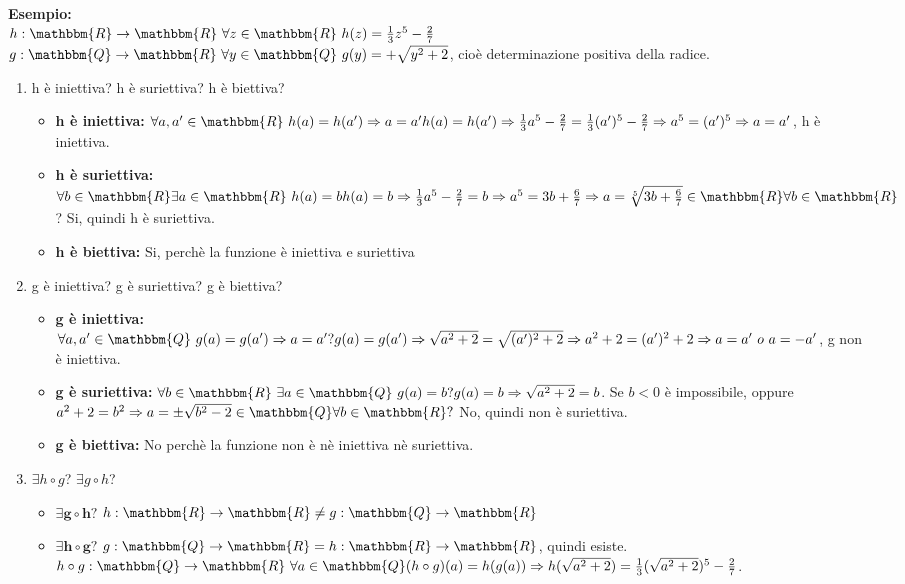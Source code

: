\documentclass[12pt, letterpaper]{report}
\begin{document}
	\textbf{Esempio: }
	\\
	$h: \mathbbm{R} \to \mathbbm{R} \ \forall z \in \mathbbm{R} \ h(z) = \frac{1}{3}z^5 - \frac{2}{7}$
	\\
	$g: \mathbbm{Q} \to \mathbbm{R} \ \forall y \in \mathbbm{Q} \ g(y) = + \sqrt{y^2 + 2}$, cioè determinazione positiva della radice.
	\begin{enumerate}
		\item h è iniettiva? h è suriettiva? h è biettiva?
			\begin{itemize}
				\item \textbf{h è iniettiva:} $\forall a, a' \in \mathbbm{R} \ h(a) = h(a') \Rightarrow a = a' \\ h(a) = h(a') \Rightarrow \frac{1}{3}a^5 - \frac{2}{7} = \frac{1}{3}(a')^5 - \frac{2}{7} \Rightarrow a^5 = (a')^5 \Rightarrow a = a'$, h è iniettiva.
				\item \textbf{h è suriettiva:} $\forall b \in \mathbbm{R} \exists a \in \mathbbm{R} \ h(a) = b \\ h(a) = b \Rightarrow \frac{1}{3}a^5 - \frac{2}{7} = b \Rightarrow a^5 = 3b + \frac{6}{7} \Rightarrow a = \sqrt[5]{3b + \frac{6}{7}} \in \mathbbm{R} \forall b \in \mathbbm{R}$ ? Si, quindi h è suriettiva.
				\item \textbf{h è biettiva:} Si, perchè la funzione è iniettiva e suriettiva
			\end{itemize}
		\item g è iniettiva? g è suriettiva? g è biettiva?
			\begin{itemize}
				\item \textbf{g è iniettiva:} $\forall a, a' \in \mathbbm{Q} \ g(a) = g(a') \Rightarrow a = a' ? \\ g(a) = g(a') \Rightarrow \sqrt{a^2 + 2} = \sqrt{(a')^2 + 2} \Rightarrow a^2 + 2 = (a')^2 + 2 \Rightarrow a = a' \ o \ a = -a'$, g non è iniettiva.
				\item \textbf{g è suriettiva:} $\forall b \in \mathbbm{R} \ \exists a \in \mathbbm{Q} \ g(a) = b ? \\ g(a) = b \Rightarrow \sqrt{a^2 + 2} = b$. Se $b < 0$ è impossibile, oppure $a^2 + 2 = b^2 \Rightarrow a = \pm \sqrt{b^2 - 2} \in \mathbbm{Q} \forall b \in \mathbbm{R} ? $ No, quindi non è suriettiva.
				\item \textbf{g è biettiva:} No perchè la funzione non è nè iniettiva nè suriettiva.
			\end{itemize}
		\item $\exists h \circ g$? $\exists g \circ h$?
			\begin{itemize}
				\item $\mathbf{\exists g \circ h ?}$ $h: \mathbbm{R} \to \mathbbm{R} \neq g: \mathbbm{Q} \to \mathbbm{R}$
				\item $\mathbf{\exists h \circ g ?}$ $g: \mathbbm{Q} \to \mathbbm{R} = h: \mathbbm{R} \to \mathbbm{R}$, quindi esiste.
				\\
				$h \circ g: \mathbbm{Q} \to \mathbbm{R} \ \forall a \in \mathbbm{Q} \\ (h \circ g)(a) = h(g(a)) \Rightarrow h(\sqrt{a^2 + 2}) = \frac{1}{3}(\sqrt{a^2 + 2})^5 - \frac{2}{7}$.
			\end{itemize}
	\end{enumerate}
\end{document}
